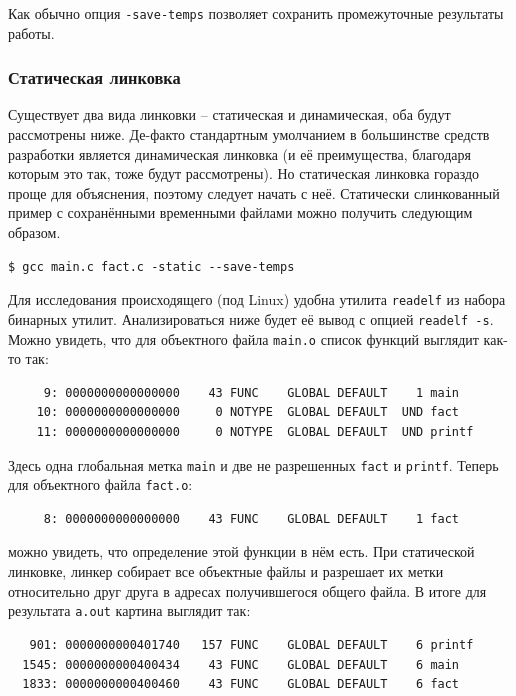 \documentclass[a4paper,12pt,oneside]{article}
\begin{document}
Как обычно опция \lstinline!-save-temps! позволяет сохранить промежуточные результаты работы.

\subsubsection{Статическая линковка}

Существует два вида линковки -- статическая и динамическая, оба будут рассмотрены ниже. Де-факто стандартным умолчанием в большинстве средств разработки является динамическая линковка (и её преимущества, благодаря которым это так, тоже будут рассмотрены). Но статическая линковка гораздо проще для объяснения, поэтому следует начать с неё. Статически слинкованный пример с сохранёнными временными файлами можно получить следующим образом.

\begin{verbatim}
$ gcc main.c fact.c -static --save-temps
\end{verbatim}

Для исследования происходящего (под Linux) удобна утилита \lstinline!readelf! из набора бинарных утилит. Анализироваться ниже будет её вывод с опцией \lstinline!readelf -s!. Можно увидеть, что для объектного файла \lstinline!main.o! список функций выглядит как-то так:

\begin{verbatim}
     9: 0000000000000000    43 FUNC    GLOBAL DEFAULT    1 main
    10: 0000000000000000     0 NOTYPE  GLOBAL DEFAULT  UND fact
    11: 0000000000000000     0 NOTYPE  GLOBAL DEFAULT  UND printf
\end{verbatim}

Здесь одна глобальная метка \lstinline!main! и две не разрешенных \lstinline!fact! и \lstinline!printf!. Теперь для объектного файла \lstinline!fact.o!:

\begin{verbatim}
     8: 0000000000000000    43 FUNC    GLOBAL DEFAULT    1 fact
\end{verbatim}

можно увидеть, что определение этой функции в нём есть. При статической линковке, линкер собирает все объектные файлы и разрешает их метки относительно друг друга в адресах получившегося общего файла. В итоге для результата \lstinline!a.out! картина выглядит так:

\begin{verbatim}
   901: 0000000000401740   157 FUNC    GLOBAL DEFAULT    6 printf
  1545: 0000000000400434    43 FUNC    GLOBAL DEFAULT    6 main
  1833: 0000000000400460    43 FUNC    GLOBAL DEFAULT    6 fact
\end{verbatim}
\end{document}
